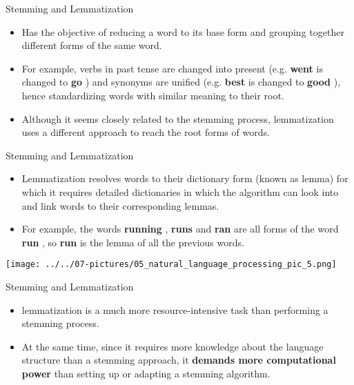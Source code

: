 \documentclass[11pt]{beamer}
\begin{document}
\begin{frame}{Stemming and Lemmatization}
	\begin{itemize}
		\item Has the objective of reducing a word to its base form and grouping together different forms of the same word. 
		\item For example, verbs in past tense are changed into present (e.g. \textbf{went} is changed to \textbf{ go }) and synonyms are unified (e.g. \textbf{ best } is changed to \textbf{ good }), hence standardizing words with similar meaning to their root. 
		\item Although it seems closely related to the stemming process, lemmatization uses a different approach to reach the root forms of words.
	\end{itemize}
\end{frame}
\begin{frame}{Stemming and Lemmatization}
	\begin{itemize}
		\item Lemmatization resolves words to their dictionary form (known as lemma) for which it requires detailed dictionaries in which the algorithm can look into and link words to their corresponding lemmas.
		\item For example, the words \textbf{running }, \textbf{ runs }  and  \textbf{ ran }  are all forms of the word \textbf{ run }, so \textbf{ run} is the lemma of all the previous words.
	\end{itemize}
	\begin{center}
	\texttt{[image: ../../07-pictures/05\_natural\_language\_processing\_pic\_5.png]}
	\end{center}
\end{frame}
\begin{frame}{Stemming and Lemmatization}
	\begin{itemize}
		\item lemmatization is a much more resource-intensive task than performing a stemming process. 
		\item At the same time, since it requires more knowledge about the language structure than a stemming approach, it \textbf{demands more computational power} than setting up or adapting a stemming algorithm.
	\end{itemize}
\end{frame}
\end{document}
